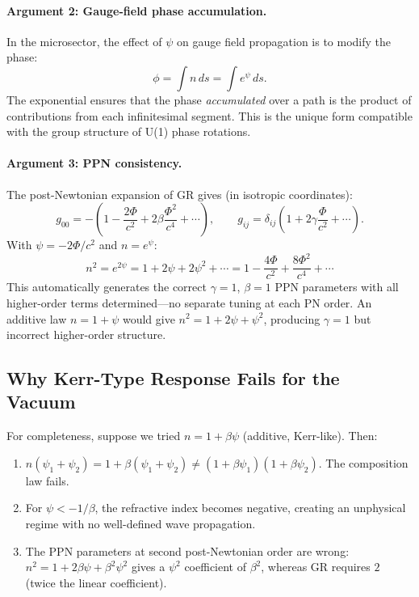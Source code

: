 \documentclass[11pt]{article}
\theoremstyle{plain}
\theoremstyle{definition}
\theoremstyle{remark}
\begin{document}
\paragraph{Argument 2: Gauge-field phase accumulation.}
In the microsector, the effect of $\psi$ on gauge field propagation is to
modify the phase:
\begin{equation}
\phi = \int n\,ds = \int e^\psi\,ds.
\end{equation}
The exponential ensures that the phase \emph{accumulated} over a path is
the product of contributions from each infinitesimal segment. This is the
unique form compatible with the group structure of U(1) phase rotations.

\paragraph{Argument 3: PPN consistency.}
The post-Newtonian expansion of GR gives (in isotropic coordinates):
\begin{equation}
g_{00} = -\left(1 - \frac{2\Phi}{c^2} + 2\beta\frac{\Phi^2}{c^4} + \cdots\right),
\qquad
g_{ij} = \delta_{ij}\left(1 + 2\gamma\frac{\Phi}{c^2} + \cdots\right).
\end{equation}
With $\psi = -2\Phi/c^2$ and $n = e^\psi$:
\begin{equation}
n^2 = e^{2\psi} = 1 + 2\psi + 2\psi^2 + \cdots
= 1 - \frac{4\Phi}{c^2} + \frac{8\Phi^2}{c^4} + \cdots
\end{equation}
This automatically generates the correct $\gamma = 1$, $\beta = 1$
PPN parameters with all higher-order terms determined---no separate
tuning at each PN order. An additive law $n = 1 + \psi$ would give
$n^2 = 1 + 2\psi + \psi^2$, producing $\gamma = 1$ but incorrect
higher-order structure.

\subsection{Why Kerr-Type Response Fails for the Vacuum}

For completeness, suppose we tried $n = 1 + \beta\psi$ (additive,
Kerr-like). Then:
\begin{enumerate}
\item $n(\psi_1 + \psi_2) = 1 + \beta(\psi_1 + \psi_2)
\neq (1 + \beta\psi_1)(1 + \beta\psi_2)$.
The composition law fails.

\item For $\psi < -1/\beta$, the refractive index becomes negative,
creating an unphysical regime with no well-defined wave propagation.

\item The PPN parameters at second post-Newtonian order are wrong:
$n^2 = 1 + 2\beta\psi + \beta^2\psi^2$ gives a $\psi^2$ coefficient
of $\beta^2$, whereas GR requires $2$ (twice the linear coefficient).
\end{enumerate}
\end{document}
